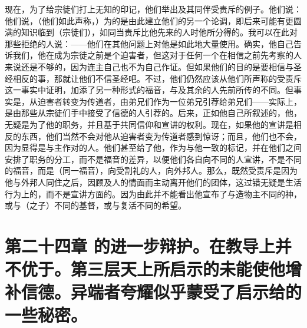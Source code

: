 现在，为了给宗徒们打上无知的印记，他们举出及其同伴受责斥的例子。他们说：他们说，（他们如此声称，）为的是由此建立他们的另一个论调，即后来可能有更圆满的知识临到（宗徒们），如同当责斥比他先来的人时他所分得的。我可以在此对那些拒绝的人说：——他们在其他问题上对他是如此地大量使用。确实，他自己告诉我们，他在成为宗徒之前是个迫害者，但这对于任何一个在相信之前先考察的人来说还是不够的，因为连主自己也不为自己作证。但如果他们的目的是要相信与圣经相反的事，那就让他们不信圣经吧。不过，他们仍然应该从他们所声称的受责斥这一事实中证明，加添了另一种形式的福音，与及其余的人先前所传的不同。但事实是，从迫害者转变为传道者，由弟兄们作为一位弟兄引荐给弟兄们——实际上，是由那些从宗徒们手中接受了信德的人引荐的。后来，正如他自己所叙述的，他，无疑是为了他的职务，并且基于共同信仰和宣讲的权利。现在，如果他的宣讲是相反的东西，他们当然不会对他从迫害者变为传道者感到惊讶；而且，他们也不会，因为显得是与主作对的人。他们甚至给了他，作为与他一致的标记，并在他们之间安排了职务的分工，而不是福音的差异，以便他们各自向不同的人宣讲，不是不同的福音，而是（同一福音），向受割礼的人，向外邦人。那么，既然受责斥是因为他与外邦人同住之后，因顾及人的情面而主动离开他们的团体，这过错无疑是生活行为上的，而不是宣讲方面的。因为由此并不能看出他宣布了与造物主不同的神，或与（之子）不同的基督，或与复活不同的希望。\par


\section{第二十四章 的进一步辩护。在教导上并不优于。第三层天上所启示的未能使他增补信德。异端者夸耀似乎蒙受了启示给的一些秘密。}

